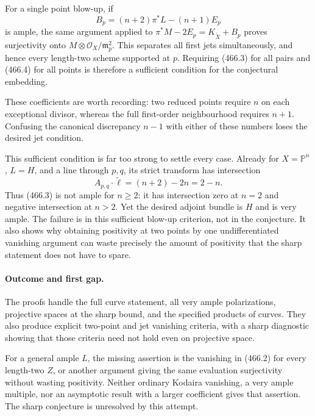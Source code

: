 \documentclass[11pt]{article}
\begin{document}
For a single point blow-up, if
\[
 B_p=(n+2)\pi^*L-(n+1)E_p
 \tag{466.4}
\]
is ample, the same argument applied to
$\pi^*M-2E_p=K_{\widetilde X}+B_p$ proves surjectivity onto
$M\otimes\mathcal O_X/\mathfrak m_p^2$. This separates all first
jets simultaneously, and hence every length-two scheme supported at
$p$. Requiring (466.3) for all pairs and (466.4) for all points is
therefore a sufficient condition for the conjectural embedding.

These coefficients are worth recording: two reduced points require
$n$ on each exceptional divisor, whereas the full first-order
neighbourhood requires $n+1$. Confusing the canonical discrepancy
$n-1$ with either of these numbers loses the desired jet condition.

This sufficient condition is far too strong to settle every case.
Already for $X=\mathbb P^n$, $L=H$, and a line through $p,q$, its
strict transform has intersection
\[
 A_{p,q}\cdot\widetilde\ell=(n+2)-2n=2-n.
\]
Thus (466.3) is not ample for $n\geq2$: it has intersection zero
at $n=2$ and negative intersection at $n>2$. Yet the desired adjoint
bundle is $H$ and is very ample. The failure is in this sufficient
blow-up criterion, not in the conjecture. It also shows why obtaining
positivity at two points by one undifferentiated vanishing argument
can waste precisely the amount of positivity that the sharp statement
does not have to spare.

\paragraph{Outcome and first gap.}
The proofs handle the full curve statement, all very ample
polarizations, projective spaces at the sharp bound, and the specified
products of curves. They also produce explicit two-point and jet
vanishing criteria, with a sharp diagnostic showing that those criteria
need not hold even on projective space.

For a general ample $L$, the missing assertion is the vanishing in
(466.2) for every length-two $Z$, or another argument giving the same
evaluation surjectivity without wasting positivity. Neither ordinary
Kodaira vanishing, a very ample multiple, nor an asymptotic result with
a larger coefficient gives that assertion. The sharp conjecture is
unresolved by this attempt.
\end{document}
